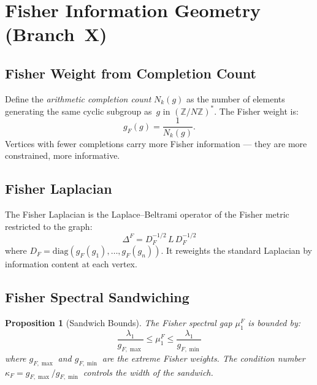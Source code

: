 \documentclass[12pt,reqno]{amsart}
\theoremstyle{plain}
\newtheorem{proposition}[theorem]{Proposition}
\theoremstyle{definition}
\theoremstyle{remark}
\newcommand{\ZZ}{\mathbb{Z}}
\begin{document}
\section{Fisher Information Geometry (Branch~X)}\label{sec:fisher}

\subsection{Fisher Weight from Completion Count}

Define the \emph{arithmetic completion count} $N_k(g)$ as the number
of elements generating the same cyclic subgroup as~$g$ in
$(\ZZ/N\ZZ)^*$.  The Fisher weight is:
\begin{equation}\label{eq:fisher_weight}
  g_F(g) = \frac{1}{N_k(g)}.
\end{equation}
Vertices with fewer completions carry more Fisher information ---
they are more constrained, more informative.

\subsection{Fisher Laplacian}

The Fisher Laplacian is the Laplace--Beltrami operator of the Fisher
metric restricted to the graph:
\begin{equation}\label{eq:fisher_laplacian}
  \Delta^F = D_F^{-1/2} \, L \, D_F^{-1/2}
\end{equation}
where $D_F = \mathrm{diag}(g_F(g_1), \ldots, g_F(g_n))$.  It
reweights the standard Laplacian by information content at each vertex.

\subsection{Fisher Spectral Sandwiching}

\begin{proposition}[Sandwich Bounds]\label{prop:sandwich}
  The Fisher spectral gap $\mu_1^F$ is bounded by:
  \begin{equation}\label{eq:sandwich}
    \frac{\lambda_1}{g_{F,\max}} \leq \mu_1^F
    \leq \frac{\lambda_1}{g_{F,\min}}
  \end{equation}
  where $g_{F,\max}$ and $g_{F,\min}$ are the extreme Fisher weights.
  The condition number $\kappa_F = g_{F,\max} / g_{F,\min}$ controls
  the width of the sandwich.
\end{proposition}
\end{document}
